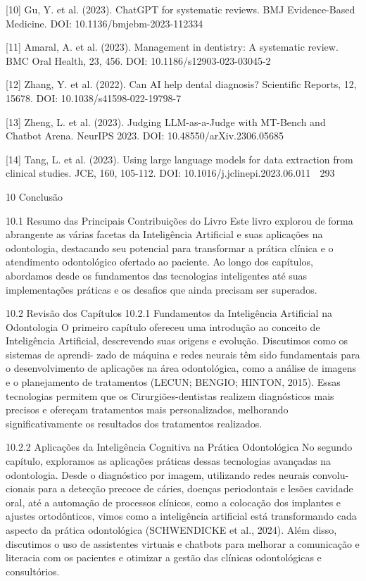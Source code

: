[10] Gu, Y. et al. (2023). ChatGPT for systematic reviews. BMJ Evidence-Based
     Medicine. DOI: 10.1136/bmjebm-2023-112334

[11] Amaral, A. et al. (2023). Management in dentistry: A systematic review. BMC Oral
     Health, 23, 456. DOI: 10.1186/s12903-023-03045-2

[12] Zhang, Y. et al. (2022). Can AI help dental diagnosis? Scientific Reports, 12,
     15678. DOI: 10.1038/s41598-022-19798-7

[13] Zheng, L. et al. (2023). Judging LLM-as-a-Judge with MT-Bench and Chatbot
     Arena. NeurIPS 2023. DOI: 10.48550/arXiv.2306.05685

[14] Tang, L. et al. (2023). Using large language models for data extraction from clinical
     studies. JCE, 160, 105-112. DOI: 10.1016/j.jclinepi.2023.06.011
                                                                                       293



10 Conclusão

10.1      Resumo das Principais Contribuições do Livro
Este livro explorou de forma abrangente as várias facetas da Inteligência Artificial e suas
aplicações na odontologia, destacando seu potencial para transformar a prática clínica
e o atendimento odontológico ofertado ao paciente. Ao longo dos capítulos, abordamos
desde os fundamentos das tecnologias inteligentes até suas implementações práticas
e os desafios que ainda precisam ser superados.


10.2      Revisão dos Capítulos
10.2.1    Fundamentos da Inteligência Artificial na Odontologia
O primeiro capítulo ofereceu uma introdução ao conceito de Inteligência Artificial,
descrevendo suas origens e evolução. Discutimos como os sistemas de aprendi-
zado de máquina e redes neurais têm sido fundamentais para o desenvolvimento de
aplicações na área odontológica, como a análise de imagens e o planejamento de
tratamentos (LECUN; BENGIO; HINTON, 2015). Essas tecnologias permitem que
os Cirurgiões-dentistas realizem diagnósticos mais precisos e ofereçam tratamentos
mais personalizados, melhorando significativamente os resultados dos tratamentos
realizados.

10.2.2    Aplicações da Inteligência Cognitiva na Prática Odontológica
No segundo capítulo, exploramos as aplicações práticas dessas tecnologias avançadas
na odontologia. Desde o diagnóstico por imagem, utilizando redes neurais convolu-
cionais para a detecção precoce de cáries, doenças periodontais e lesões cavidade
oral, até a automação de processos clínicos, como a colocação dos implantes e ajustes
ortodônticos, vimos como a inteligência artificial está transformando cada aspecto da
prática odontológica (SCHWENDICKE et al., 2024). Além disso, discutimos o uso
de assistentes virtuais e chatbots para melhorar a comunicação e literacia com os
pacientes e otimizar a gestão das clínicas odontológicas e consultórios.

